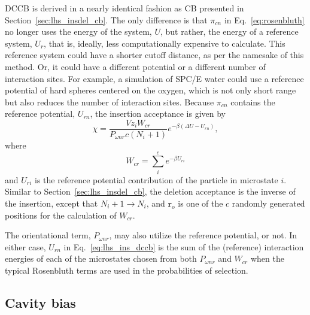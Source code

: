 \documentclass[
  9pt,
  bestpractices,
  pubversion,
]{livecoms}
\begin{document}
DCCB \cite{vlugt_improving_1998} is derived in a nearly identical fashion as CB presented in Section~\ref{sec:lhs_insdel_cb}.
The only difference is that $\pi_{cn}$ in Eq.~\ref{eq:rosenbluth} no longer uses the energy of the system, $U$, but rather, the energy of a reference system, $U_{r}$, that is, ideally, less computationally expensive to calculate.
This reference system could have a shorter cutoff distance, as per the namesake of this method.
Or, it could have a different potential or a different number of interaction sites.
For example, a simulation of SPC/E water could use a reference potential of hard spheres centered on the oxygen, which is not only short range but also reduces the number of interaction sites.
Because $\pi_{cn}$ contains the reference potential, $U_{rn}$, the insertion acceptance is given by
\begin{equation}
\chi = \frac{Vz_i W_{{c}r}}{P_{\omega nr}{c}(N_i+1)}e^{-\beta(\Delta U - U_{rn})},
\label{eq:lhs_ins_dccb}
\end{equation}
where
\begin{equation}
W_{{c}r}=\sum_{i}^{c} e^{-\beta U_{ri}}
\label{eq:wcr}
\end{equation}
and $U_{ri}$ is the reference potential contribution of the particle in microstate $i$.
Similar to Section~\ref{sec:lhs_insdel_cb}, the deletion acceptance is the inverse of the insertion, except that $N_i+1 \rightarrow N_i$, and $\mathbf{r}_o$ is one of the $c$ randomly generated positions for the calculation of $W_{{c}r}$.

The orientational term, $P_{\omega nr}$, may also utilize the reference potential, or not.
In either case, $U_{rn}$ in Eq.~\ref{eq:lhs_ins_dccb} is the sum of the (reference) interaction energies of each of the microstates chosen from both $P_{\omega nr}$ and $W_{cr}$ when the typical Rosenbluth terms are used in the probabilities of selection.

\subsection{\label{sec:lhs_insdel_cavity}Cavity bias}
\end{document}
